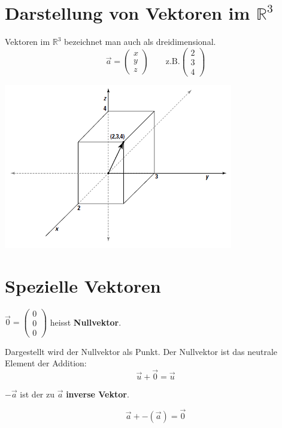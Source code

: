 \section{Darstellung von Vektoren im $\mathbb{R}^3$}
Vektoren im $\mathbb{R}^3$ bezeichnet man auch als dreidimensional.
\begin{equation*}
\vec{a} = \begin{pmatrix}x\\y\\z \end{pmatrix} \quad\quad \mbox{z.B.} \begin{pmatrix}2\\3\\4 \end{pmatrix}
\end{equation*}
\begin{center}\includegraphics[scale=1]{imgs/Vektor3D.png}\end{center}
\section{Spezielle Vektoren}
\begin{mydef}
$\vec{0} = \begin{pmatrix}0\\0\\0 \end{pmatrix}$ heisst \textbf{Nullvektor}.\end{mydef}
\noindent Dargestellt wird der Nullvektor als Punkt. Der Nullvektor ist das neutrale Element der Addition:
\begin{equation*}
\vec{u} + \vec{0} = \vec{u} 
\end{equation*}
\begin{mydef}
$-\vec{a}$ ist der zu $\vec{a}$ \textbf{inverse Vektor}.\end{mydef}
\begin{equation*}
\vec{a} + -(\vec{a}) = \vec{0}
\end{equation*}
